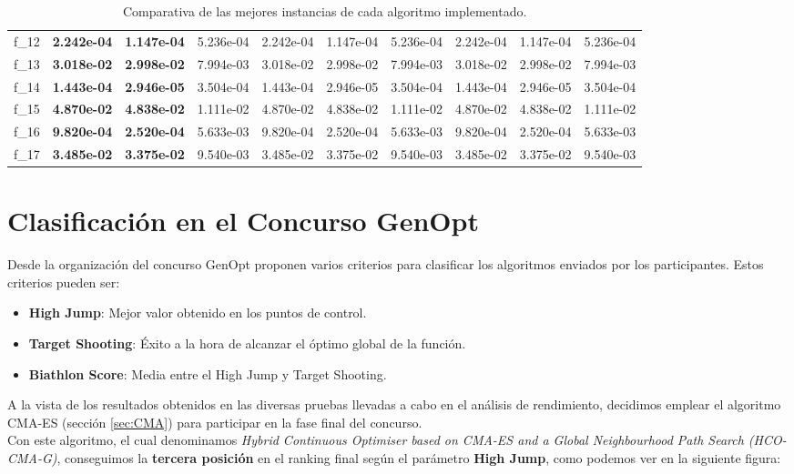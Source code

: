 \begin{table}[!ht]
{\begin{tabular}{LLLLLLLLLL}
f_{12} & {\bf 2.242e-04} & {\bf 1.147e-04} & 5.236e-04 & 2.242e-04 & 1.147e-04 & 5.236e-04 & 2.242e-04 & 1.147e-04 & 5.236e-04 \\
f_{13} & {\bf 3.018e-02} & {\bf 2.998e-02} & 7.994e-03 & 3.018e-02 & 2.998e-02 & 7.994e-03 & 3.018e-02 & 2.998e-02 & 7.994e-03 \\
f_{14} & {\bf 1.443e-04} & {\bf 2.946e-05} & 3.504e-04 & 1.443e-04 & 2.946e-05 & 3.504e-04 & 1.443e-04 & 2.946e-05 & 3.504e-04 \\
f_{15} & {\bf 4.870e-02} & {\bf 4.838e-02} & 1.111e-02 & 4.870e-02 & 4.838e-02 & 1.111e-02 & 4.870e-02 & 4.838e-02 & 1.111e-02 \\
f_{16} & {\bf 9.820e-04} & {\bf 2.520e-04} & 5.633e-03 & 9.820e-04 & 2.520e-04 & 5.633e-03 & 9.820e-04 & 2.520e-04 & 5.633e-03 \\
f_{17} & {\bf 3.485e-02} & {\bf 3.375e-02} & 9.540e-03 & 3.485e-02 & 3.375e-02 & 9.540e-03 & 3.485e-02 & 3.375e-02 & 9.540e-03 \\
    \bottomrule
    \end{tabular}}
    \captionsetup{justification=centering}
    \caption{Comparativa de las mejores instancias de cada algoritmo implementado.}    
\end{table}
\newpage

\section{Clasificación en el Concurso GenOpt}\label{sec:Competition}

Desde la organización del concurso GenOpt proponen varios criterios para clasificar los algoritmos enviados por los participantes. Estos criterios pueden ser:

\begin{itemize}
    	  	\item \textbf{High Jump}: Mejor valor obtenido en los puntos de control.
    	  	\item \textbf{Target Shooting}: Éxito a la hora de alcanzar el óptimo global de la función.
    	  	\item \textbf{Biathlon Score}: Media entre el High Jump y Target Shooting.
\end{itemize}

A la vista de los resultados obtenidos en las diversas pruebas llevadas a cabo en el análisis de rendimiento, decidimos emplear el algoritmo CMA-ES (sección \ref{sec:CMA}) para participar en la fase final del concurso. \\
Con este algoritmo, el cual denominamos \textit{Hybrid Continuous Optimiser based on CMA-ES and a Global Neighbourhood Path Search (HCO-CMA-G)}, conseguimos la \textbf{tercera posición} en el ranking final según el parámetro \textbf{High Jump}, como podemos ver en la siguiente figura: 

